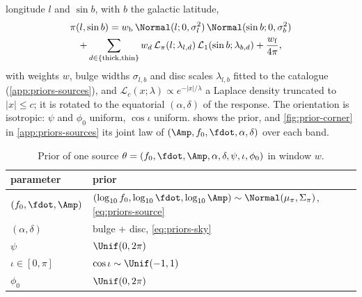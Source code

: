 longitude $l$ and $\sin b$, with $b$ the galactic latitude,
\begin{multline}
  \pi(l, \sin b) = w_{\rm b}\,\Normal(l; 0, \sigma_l^2)\,\Normal(\sin b; 0, \sigma_b^2)\\
  + \sum_{d\in\{\rm thick, thin\}} w_d\,\mathcal{L}_{\pi}(l; \lambda_{l,d})\,\mathcal{L}_{1}(\sin b; \lambda_{b,d})
  + \frac{w_{\rm f}}{4\pi},
  \label{eq:priors-sky}
\end{multline}
with weights $w$, bulge widths $\sigma_{l,b}$ and disc scales $\lambda_{l,b}$ fitted to the
catalogue (\cref{app:priors-sources}), and $\mathcal{L}_c(x;\lambda)\propto e^{-|x|/\lambda}$ a
Laplace density truncated to $|x|\le c$; it is rotated to the equatorial $(\alpha,\delta)$ of the
response. The orientation is isotropic: $\psi$ and $\phi_0$ uniform, $\cos\iota$ uniform.
 shows the prior, and \cref{fig:prior-corner} in \cref{app:priors-sources} its joint law of
$(\Amp, f_0, \fdot, \alpha, \delta)$ over each band.


\begin{table}[t]
\caption{Prior of one source $\theta = (f_0, \fdot, \Amp, \alpha, \delta, \psi, \iota, \phi_0)$ in
window $w$.}
\label{tab:priors-source}
\centering
\footnotesize
\begin{tabular}{@{}lp{}@{}}
\toprule
parameter & prior \\
\midrule
$(f_0, \fdot, \Amp)$ & $(\log_{10}f_0, \log_{10}\fdot, \log_{10}\Amp)\sim\Normal(\mu_\pi, \Sigma_\pi)$, \cref{eq:priors-source} \\
$(\alpha, \delta)$ & bulge + disc, \cref{eq:priors-sky} \\
$\psi$ & $\Unif(0, 2\pi)$ \\
$\iota\in[0,\pi]$ & $\cos\iota\sim\Unif(-1, 1)$ \\
$\phi_0$ & $\Unif(0, 2\pi)$ \\
\bottomrule
\end{tabular}
\end{table}


